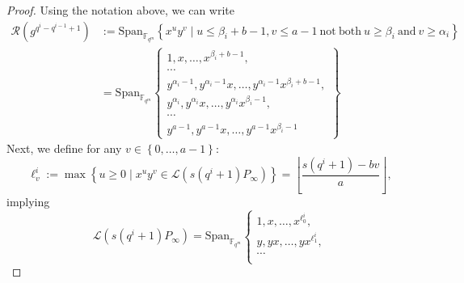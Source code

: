 \documentclass[a4paper]{article}
\theoremstyle{definition}
\theoremstyle{remark}
\newcommand{\calL}{\mathcal{L}}
\newcommand{\calR}{\mathcal{R}}
\newcommand{\fqm}{\mathbb{F}_{q^m}}
\newcommand{\set}[1]{\left\{#1\right\}}
\newcommand{\degab}[1]{\deg_{a,b}\left(#1\right)}
\begin{document}
\begin{proof}

Using the notation above, we can write
\begin{align*}
\calR\left(g^{q^i-q^{i-1}+1}\right) &:= \mathrm{Span}_{\fqm} \left\{x^uy^v \mid u \leq \beta_i+b-1 , v \leq a-1 \ \mathrm{not \ both} \ u \geq \beta_i \ \mathrm{and} \ v \geq \alpha_i\right\} \\
&= \mathrm{Span}_{\fqm}    \left\{ \begin{array}{c}
         1,x,\dots,x^{\beta_i +b-1},   \\
         \cdots \\
         y^{\alpha_i -1},y^{\alpha_i -1}x,\dots,y^{\alpha_i -1}x^{\beta_i +b-1}, \\
          y^{\alpha_i},y^{\alpha_i}x,\dots,y^{\alpha_i}x^{\beta_i-1}, \\
         \cdots \\
         y^{a-1},y^{a-1}x,\dots,y^{a-1}x^{\beta_i-1}
    \end{array}
    \right\}
\end{align*}
Next, we define for any $v \in \set{0,\dots,a-1}$:
$$\ell^i_v := \max \set{u \geq 0 \mid x^uy^v \in \calL(s(q^i+1)P_\infty)} = \left\lfloor \dfrac{s(q^i+1)-bv}{a}\right\rfloor,$$
implying
\begin{equation*}
\calL(s(q^i+1)P_\infty) = \mathrm{Span}_{\fqm}    \left\{ \begin{array}{c}
         1,x,\dots,x^{\ell^i_0},   \\
         y,yx,\dots,yx^{\ell^i_1}, \\
         \cdots \\

\end{array}
\end{equation*}
\end{proof}
\end{document}
